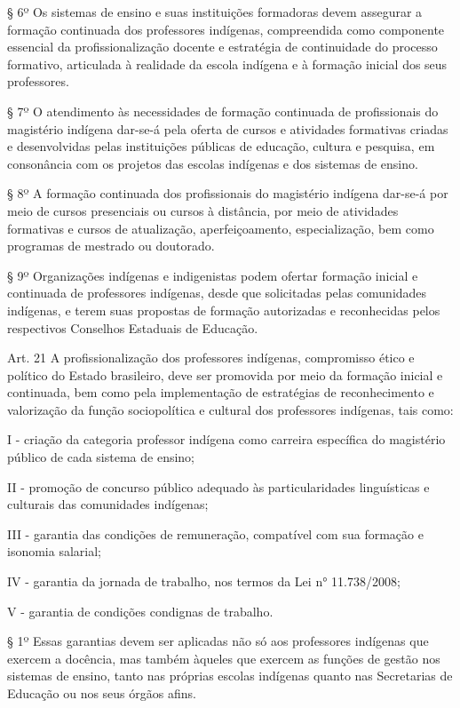 \documentclass[
]{book}
\begin{document}
§ 6º Os sistemas de ensino e suas instituições formadoras devem assegurar a formação continuada dos professores indígenas, compreendida como componente essencial da profissionalização docente e estratégia de continuidade do processo formativo, articulada à realidade da escola indígena e à formação inicial dos seus professores.

§ 7º O atendimento às necessidades de formação continuada de profissionais do magistério indígena dar-se-á pela oferta de cursos e atividades formativas criadas e desenvolvidas pelas instituições públicas de educação, cultura e pesquisa, em consonância com os projetos das escolas indígenas e dos sistemas de ensino.

§ 8º A formação continuada dos profissionais do magistério indígena dar-se-á por meio de cursos presenciais ou cursos à distância, por meio de atividades formativas e cursos de atualização, aperfeiçoamento, especialização, bem como programas de mestrado ou doutorado.

§ 9º Organizações indígenas e indigenistas podem ofertar formação inicial e continuada de professores indígenas, desde que solicitadas pelas comunidades indígenas, e terem suas propostas de formação autorizadas e reconhecidas pelos respectivos Conselhos Estaduais de Educação.

Art. 21 A profissionalização dos professores indígenas, compromisso ético e político do Estado brasileiro, deve ser promovida por meio da formação inicial e continuada, bem como pela implementação de estratégias de reconhecimento e valorização da função sociopolítica e cultural dos professores indígenas, tais como:

I - criação da categoria professor indígena como carreira específica do magistério público de cada sistema de ensino;

II - promoção de concurso público adequado às particularidades linguísticas e culturais das comunidades indígenas;

III - garantia das condições de remuneração, compatível com sua formação e isonomia salarial;

IV - garantia da jornada de trabalho, nos termos da Lei n° 11.738/2008;

V - garantia de condições condignas de trabalho.

§ 1º Essas garantias devem ser aplicadas não só aos professores indígenas que exercem a docência, mas também àqueles que exercem as funções de gestão nos sistemas de ensino, tanto nas próprias escolas indígenas quanto nas Secretarias de Educação ou nos seus órgãos afins.
\end{document}
